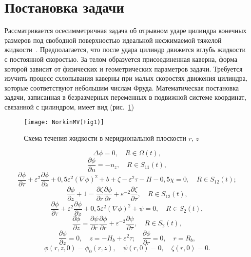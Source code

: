 \documentclass[press]{vestnik}
\begin{document}
\section{Постановка задачи}

Рассматривается осесимметричная задача об отрывном ударе цилиндра конечных 
размеров под свободной поверхностью идеальной несжимаемой тяжелой жидкости~\cite{B01}. Предполагается, что после удара цилиндр движется вглубь жидкости с 
постоянной скоростью. За телом образуется присоединенная каверна, форма 
которой зависит от физических и геометрических параметров задачи. Требуется 
изучить процесс схлопывания каверны при малых скоростях движения цилиндра, 
которые соответствуют небольшим числам Фруда. Математическая постановка 
задачи, записанная в безразмерных переменных в подвижной системе координат, 
связанной с цилиндром, имеет вид (рис.~\ref{fig1})
\begin{figure}[ht]
\centering
\texttt{[image: NorkinMV(Fig1)]}
\caption{Схема течения жидкости в меридиональной плоскости $r$, $z$}
\label{fig1}
\end{figure}
\begin{equation}\label{1.1}
\Delta \phi =0, \quad  R\in \Omega (t),
\end{equation}
\begin{equation}\label{1.2}
\frac{\partial \phi }{\partial n}=-n_{z} ,
\quad
R\in S_{11} (t),
\end{equation}
\begin{equation}\label{1.3}
\frac{\partial \phi }{\partial \tau }+\varepsilon^{2}\frac{\partial \phi }{\partial z}+0,5\varepsilon^{2}\left( {\nabla \phi } \right)^{2}+b+\zeta -\varepsilon^{2}\tau -H-0,5\chi =0,
\quad
R\in S_{12} (t);
\end{equation}
\begin{equation}\label{1.4}
\frac{\partial \phi }{\partial z}+1=\frac{\partial \zeta }{\partial r}\frac{\partial \phi }{\partial r}+\varepsilon^{-2}\frac{\partial \zeta }{\partial \tau },
\quad
R\in S_{12} (t),
\end{equation}
\begin{equation}\label{1.5}
\frac{\partial \phi }{\partial \tau }+\varepsilon^{2}\frac{\partial \phi }{\partial z}+0,5\varepsilon^{2}\left( {\nabla \phi } \right)^{2}+\psi =0,
\quad
R\in S_{2} (t),
\end{equation}
\begin{equation}\label{1.6}
\frac{\partial \phi }{\partial z}=\frac{\partial \psi }{\partial r}\frac{\partial \phi }{\partial r}+\varepsilon^{-2}\frac{\partial \psi }{\partial \tau },
\quad
R\in S_{2} (t),
\end{equation}
\begin{equation}\label{1.7}
\frac{\partial \phi }{\partial z}=0,
\quad
z=-H_{b} +\varepsilon^{2}\tau ;
\quad
\frac{\partial \phi }{\partial r}=0,
\quad
r=R_{b},
\end{equation}
\begin{equation}\label{1.8}
\phi (r,z,0)=\phi_{0} (r,z),
\quad
\psi (r,0)=0,
\quad
\zeta (r,0)=0.
\end{equation}
\end{document}
